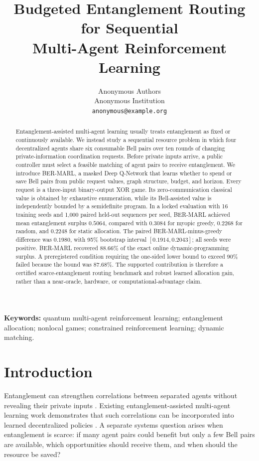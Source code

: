 \documentclass[10pt,twocolumn]{article}
\title{Budgeted Entanglement Routing for Sequential\\Multi-Agent Reinforcement Learning}
\author{Anonymous Authors\\Anonymous Institution\\\texttt{anonymous@example.org}}
\date{}
\newcommand{\method}{\textsc{BER-MARL}}
\begin{document}
\maketitle

\begin{abstract}
Entanglement-assisted multi-agent learning usually treats entanglement as fixed or continuously available. We instead study a sequential resource problem in which four decentralized agents share six consumable Bell pairs over ten rounds of changing private-information coordination requests. Before private inputs arrive, a public controller must select a feasible matching of agent pairs to receive entanglement. We introduce \method, a masked Deep Q-Network that learns whether to spend or save Bell pairs from public request values, graph structure, budget, and horizon. Every request is a three-input binary-output XOR game. Its zero-communication classical value is obtained by exhaustive enumeration, while its Bell-assisted value is independently bounded by a semidefinite program. In a locked evaluation with 16 training seeds and 1,000 paired held-out sequences per seed, \method{} achieved mean entanglement surplus $0.5064$, compared with $0.3084$ for myopic greedy, $0.2268$ for random, and $0.2248$ for static allocation. The paired \method-minus-greedy difference was $0.1980$, with 95\% bootstrap interval $[0.1914,0.2043]$; all seeds were positive. \method{} recovered 88.66\% of the exact online dynamic-programming surplus. A preregistered condition requiring the one-sided lower bound to exceed 90\% failed because the bound was 87.68\%. The supported contribution is therefore a certified scarce-entanglement routing benchmark and robust learned allocation gain, rather than a near-oracle, hardware, or computational-advantage claim.
\end{abstract}

\noindent\textbf{Keywords:} quantum multi-agent reinforcement learning; entanglement allocation; nonlocal games; constrained reinforcement learning; dynamic matching.

\section{Introduction}
Entanglement can strengthen correlations between separated agents without revealing their private inputs \cite{bell1964einstein,clauser1969proposed,tsirelson1980quantum}. Existing entanglement-assisted multi-agent learning work demonstrates that such correlations can be incorporated into learned decentralized policies \cite{derieux2025eqmarl}. A separate systems question arises when entanglement is scarce: if many agent pairs could benefit but only a few Bell pairs are available, which opportunities should receive them, and when should the resource be saved?
\end{document}

